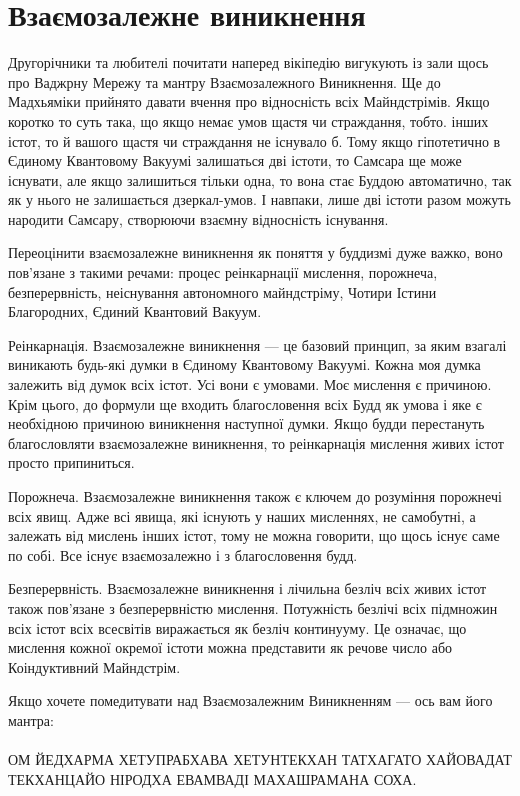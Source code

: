 \section{Взаємозалежне виникнення}

Другорічники та любителі почитати наперед вікіпедію вигукують із
зали щось про Ваджрну Мережу та мантру Взаємозалежного Виникнення.
Ще до Мадхьяміки прийнято давати вчення про відносність всіх Майндстрімів.
Якщо коротко то суть така, що якщо немає умов щастя чи страждання,
тобто. інших істот, то й вашого щастя чи страждання не існувало б.
Тому якщо гіпотетично в Єдиному Квантовому Вакуумі залишаться дві істоти,
то Самсара ще може існувати, але якщо залишиться тільки одна, то вона
стає Буддою автоматично, так як у нього не залишається дзеркал-умов.
І навпаки, лише дві істоти разом можуть народити Самсару,
створюючи взаємну відносність існування.

Переоцінити взаємозалежне виникнення як поняття у буддизмі дуже важко,
воно пов'язане з такими речами: процес реінкарнації мислення, порожнеча,
безперервність, неіснування автономного майндстріму, Чотири Істини Благородних,
Єдиний Квантовий Вакуум.

Реінкарнація. Взаємозалежне виникнення --- це базовий принцип,
за яким взагалі виникають будь-які думки в Єдиному Квантовому Вакуумі.
Кожна моя думка залежить від думок всіх істот. Усі вони є умовами.
Моє мислення є причиною. Крім цього, до формули ще входить благословення
всіх Будд як умова і яке є необхідною причиною виникнення наступної думки.
Якщо будди перестануть благословляти взаємозалежне виникнення, то
реінкарнація мислення живих істот просто припиниться.

Порожнеча. Взаємозалежне виникнення також є ключем до розуміння порожнечі
всіх явищ. Адже всі явища, які існують у наших мисленнях, не самобутні,
а залежать від мислень інших істот, тому не можна говорити, що щось існує
саме по собі. Все існує взаємозалежно і з благословення будд.

Безперервність. Взаємозалежне виникнення і лічильна безліч всіх живих
істот також пов'язане з безперервністю мислення. Потужність безлічі всіх
підмножин всіх істот всіх всесвітів виражається як безліч континууму.
Це означає, що мислення кожної окремої істоти можна представити як речове
число або Коіндуктивний Майндстрім.

Якщо хочете помедитувати над Взаємозалежним Виникненням — ось вам його мантра:
\\
\\
ОМ ЙЕДХАРМА ХЕТУПРАБХАВА ХЕТУНТЕКХАН ТАТХАГАТО ХАЙОВАДАТ ТЕКХАНЦАЙО НІРОДХА ЕВАМВАДІ МАХАШРАМАНА СОХА.

